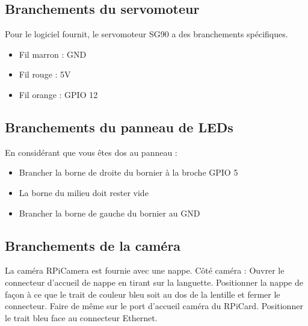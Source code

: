 \subsection{Branchements du servomoteur}

Pour le logiciel fournit, le servomoteur \gls{SG90} a des branchements spécifiques.
\begin{itemize}
    \item Fil marron : GND
    \item Fil rouge  : 5V
    \item Fil orange : GPIO 12
\end{itemize}

\subsection{Branchements du panneau de LEDs}

En considérant que vous êtes dos au panneau :
\begin{itemize}
    \item Brancher la borne de droite du bornier à la broche GPIO 5
    \item La borne du milieu doit rester vide
    \item Brancher la borne de gauche du bornier au GND
\end{itemize}

\subsection{Branchements de la caméra}
La caméra \gls{RPiCamera} est fournie avec une nappe. Côté caméra : Ouvrer le connecteur d'accueil de nappe en tirant sur la languette.
Positionner la nappe de façon à ce que le trait de couleur bleu soit au dos de la lentille et fermer le connecteur.
Faire de même sur le port d'accueil caméra du \gls{RPiCard}. Positionner le trait bleu face au connecteur Ethernet.
